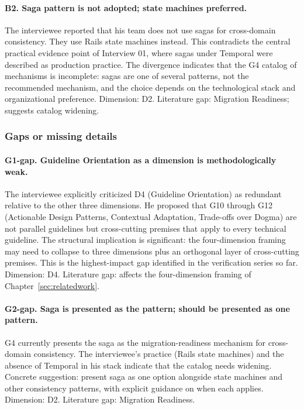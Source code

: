\paragraph*{B2. Saga pattern is not adopted; state machines preferred.} The interviewee reported that his team does not use sagas for cross-domain consistency. They use Rails state machines instead. This contradicts the central practical evidence point of Interview 01, where sagas under Temporal were described as production practice. The divergence indicates that the G4 catalog of mechanisms is incomplete: sagas are one of several patterns, not the recommended mechanism, and the choice depends on the technological stack and organizational preference. Dimension: D2. Literature gap: Migration Readiness; suggests catalog widening.

\subsubsection*{Gaps or missing details}

\paragraph*{G1-gap. Guideline Orientation as a dimension is methodologically weak.} The interviewee explicitly criticized D4 (Guideline Orientation) as redundant relative to the other three dimensions. He proposed that G10 through G12 (Actionable Design Patterns, Contextual Adaptation, Trade-offs over Dogma) are not parallel guidelines but cross-cutting premises that apply to every technical guideline. The structural implication is significant: the four-dimension framing may need to collapse to three dimensions plus an orthogonal layer of cross-cutting premises. This is the highest-impact gap identified in the verification series so far. Dimension: D4. Literature gap: affects the four-dimension framing of Chapter~\ref{sec:relatedwork}.

\paragraph*{G2-gap. Saga is presented as the pattern; should be presented as one pattern.} G4 currently presents the saga as the migration-readiness mechanism for cross-domain consistency. The interviewee's practice (Rails state machines) and the absence of Temporal in his stack indicate that the catalog needs widening. Concrete suggestion: present saga as one option alongside state machines and other consistency patterns, with explicit guidance on when each applies. Dimension: D2. Literature gap: Migration Readiness.

